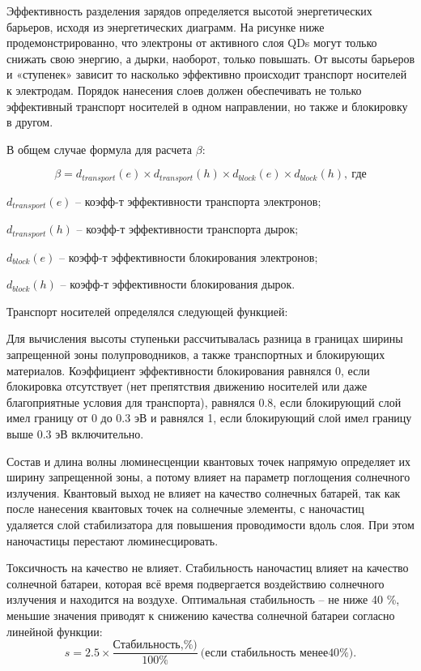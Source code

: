 Эффективность разделения зарядов определяется высотой энергетических барьеров, исходя из энергетических диаграмм. На рисунке ниже продемонстрированно, что электроны от активного слоя QDs могут только снижать свою энергию, а дырки, наоборот, только повышать. От высоты барьеров и «ступенек» зависит то насколько эффективно происходит транспорт носителей к электродам. Порядок нанесения слоев должен обеспечивать не только эффективный транспорт носителей в одном направлении, но также и блокировку в другом.

В общем случае формула для расчета $\beta$:

$$\beta=d_{transport} (e)\times d_{transport} (h)\times d_{block} (e)\times d_{block} (h), \: \text{где}$$

$d_{transport}(e)$ – коэфф-т эффективности транспорта электронов;

$d_{transport}(h)$ – коэфф-т эффективности транспорта дырок;

$d_{block}(e)$ – коэфф-т эффективности блокирования электронов;

$d_{block}(h)$ – коэфф-т эффективности блокирования дырок.


Транспорт носителей определялся следующей функцией:
 

Для вычисления высоты ступеньки рассчитывалась разница в границах ширины запрещенной зоны полупроводников, а также транспортных и блокирующих материалов. Коэффициент эффективности блокирования равнялся 0, если блокировка отсутствует (нет препятствия движению носителей или даже благоприятные условия для транспорта), равнялся 0.8, если блокирующий слой имел границу от 0 до 0.3 эВ и равнялся 1, если блокирующий слой имел границу выше 0.3 эВ включительно.

Состав и длина волны люминесценции квантовых точек напрямую определяет их ширину запрещенной зоны, а потому влияет на параметр поглощения солнечного излучения. Квантовый выход не влияет на качество солнечных батарей, так как после нанесения квантовых точек на солнечные элементы, с наночастиц удаляется слой стабилизатора для повышения проводимости вдоль слоя. При этом наночастицы перестают люминесцировать.

Токсичность на качество не влияет. Стабильность наночастиц влияет на качество солнечной батареи, которая всё время подвергается воздействию солнечного излучения и находится на воздухе. Оптимальная стабильность – не ниже 40 \%, меньшие значения приводят к снижению качества солнечной батареи согласно линейной функции:
$$s=2.5\times \frac{\text{Стабильность,} \%)}{100 \%} \: \text{(если стабильность менее} 40 \%).$$

